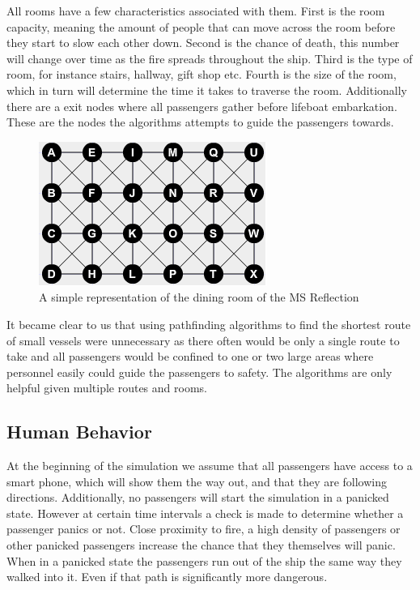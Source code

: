 All rooms have a few characteristics associated with them. First is the room capacity, meaning the amount of people that can move across the room before they start to slow each other down. Second is the chance of death, this number will change over time as the fire spreads throughout the ship. Third is the type of room, for instance stairs, hallway, gift shop etc. Fourth is the size of the room, which in turn will determine the time it takes to traverse the room. Additionally there are a exit nodes where all passengers gather before lifeboat embarkation. These are the nodes the algorithms attempts to guide the passengers towards.

\begin{figure} [h]
\centering
\includegraphics{images/complex.png}
\caption{A simple representation of the dining room of the MS Reflection}
\label{fig:complex}
\end{figure}

It became clear to us that using pathfinding algorithms to find the shortest route of small vessels were unnecessary as  there often would be only a single route to take and all passengers would be confined to one or two large areas where personnel easily could guide the passengers to safety. The algorithms are only helpful given multiple routes and rooms. 

\subsection{Human Behavior}


At the beginning of the simulation we assume that all passengers have access to a smart phone, which will show them the way out, and that they are following directions. Additionally, no passengers will start the simulation in a panicked state. However at certain time intervals a check is made to determine whether a passenger panics or not. Close proximity to fire, a high density of passengers or other panicked passengers increase the chance that they themselves will panic. When in a panicked state the passengers run out of the ship the same way they walked into it. Even if that path is significantly more dangerous.

